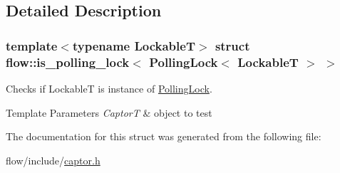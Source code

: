 \subsection{Detailed Description}
\subsubsection*{template$<$typename LockableT$>$\newline
struct flow\+::is\+\_\+polling\+\_\+lock$<$ Polling\+Lock$<$ Lockable\+T $>$ $>$}

Checks if {\ttfamily LockableT} is instance of \hyperlink{structflow_1_1_polling_lock}{Polling\+Lock}. 


\begin{DoxyTemplParams}{Template Parameters}
{\em CaptorT} & object to test \\
\hline
\end{DoxyTemplParams}


The documentation for this struct was generated from the following file\+:\begin{DoxyCompactItemize}
\item 
flow/include/\hyperlink{captor_8h}{captor.\+h}\end{DoxyCompactItemize}
